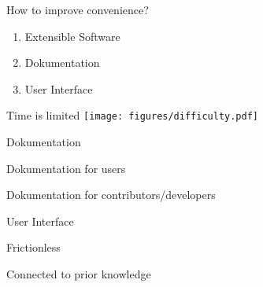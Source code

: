 \documentclass{beamer}
\newenvironment{wideitemize}{
    \itemize\addtolength{\itemsep}{15pt}\addtolength{\topsep}{10pt}}{\enditemize}
\begin{document}
    \begin{frame}{How to improve convenience?}
      \begin{enumerate}
        \item Extensible Software
        \item Dokumentation
        \item User Interface
      \end{enumerate}
    \end{frame}
    
  \begin{frame}[c]{Time is limited}
    \centering
    \texttt{[image: figures/difficulty.pdf]}
  \end{frame}

    \begin{frame}{Dokumentation}
      \begin{wideitemize}
        \item Dokumentation for users
        \item Dokumentation for contributors/developers
      \end{wideitemize}
    \end{frame}

    \begin{frame}{User Interface}
      \begin{wideitemize}
        \item Frictionless
        \item Connected to prior knowledge
      \end{wideitemize}
    \end{frame}
\end{document}
